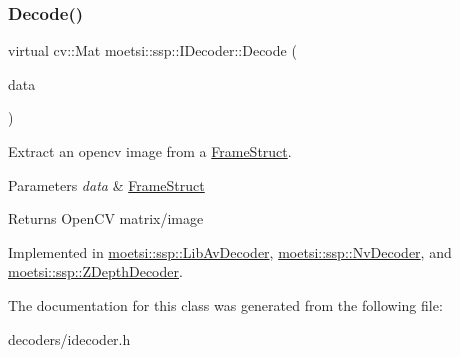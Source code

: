 \subsubsection{\texorpdfstring{Decode()}{Decode()}\hspace{0.1cm}{\footnotesize\ttfamily [2/2]}}
{\footnotesize\ttfamily virtual cv\+::\+Mat moetsi\+::ssp\+::\+I\+Decoder\+::\+Decode (\begin{DoxyParamCaption}\item[{\hyperlink{structmoetsi_1_1ssp_1_1FrameStruct}{Frame\+Struct} \&}]{data }\end{DoxyParamCaption})\hspace{0.3cm}{\ttfamily [pure virtual]}}



Extract an opencv image from a \hyperlink{structmoetsi_1_1ssp_1_1FrameStruct}{Frame\+Struct}. 


\begin{DoxyParams}{Parameters}
{\em data} & \hyperlink{structmoetsi_1_1ssp_1_1FrameStruct}{Frame\+Struct} \\
\hline
\end{DoxyParams}
\begin{DoxyReturn}{Returns}
Open\+CV matrix/image 
\end{DoxyReturn}


Implemented in \hyperlink{classmoetsi_1_1ssp_1_1LibAvDecoder_a4206a4581de1b93d6c6a0835e8cf4ac8}{moetsi\+::ssp\+::\+Lib\+Av\+Decoder}, \hyperlink{classmoetsi_1_1ssp_1_1NvDecoder_a78eb894b6825ac5ec57f5a4f4ecd7e31}{moetsi\+::ssp\+::\+Nv\+Decoder}, and \hyperlink{classmoetsi_1_1ssp_1_1ZDepthDecoder_a43226095658d616f7e38df1d43c2f88a}{moetsi\+::ssp\+::\+Z\+Depth\+Decoder}.



The documentation for this class was generated from the following file\+:\begin{DoxyCompactItemize}
\item 
decoders/idecoder.\+h\end{DoxyCompactItemize}
